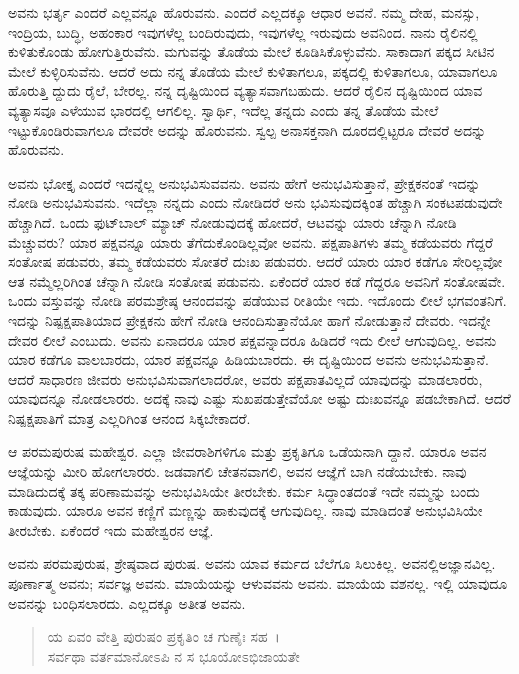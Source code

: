 ಅವನು ಭರ್ತೃ ಎಂದರೆ ಎಲ್ಲವನ್ನೂ ಹೊರುವನು. ಎಂದರೆ ಎಲ್ಲದಕ್ಕೂ ಆಧಾರ ಅವನೆ. ನಮ್ಮ ದೇಹ, ಮನಸ್ಸು, ಇಂದ್ರಿಯ, ಬುದ್ಧಿ, ಅಹಂಕಾರ ಇವುಗಳೆಲ್ಲ ಬಂದಿರುವುದು, ಇವುಗಳೆಲ್ಲ ಇರುವುದು ಅವನಿಂದ. ನಾನು ರೈಲಿನಲ್ಲಿ ಕುಳಿತುಕೊಂಡು ಹೋಗುತ್ತಿರುವೆನು. ಮಗುವನ್ನು ತೊಡೆಯ ಮೇಲೆ ಕೂಡಿಸಿಕೊಳ್ಳುವೆನು. ಸಾಕಾದಾಗ ಪಕ್ಕದ ಸೀಟಿನ ಮೇಲೆ ಕುಳ್ಳಿರಿಸುವೆನು. ಆದರೆ ಅದು ನನ್ನ ತೊಡೆಯ ಮೇಲೆ ಕುಳಿತಾಗಲೂ, ಪಕ್ಕದಲ್ಲಿ ಕುಳಿತಾಗಲೂ, ಯಾವಾಗಲೂ ಹೊರುತ್ತಿ ದ್ದುದು ರೈಲೆ, ಬೇರಲ್ಲ. ನನ್ನ ದೃಷ್ಟಿಯಿಂದ ವ್ಯತ್ಯಾಸವಾಗಬಹುದು. ಆದರೆ ರೈಲಿನ ದೃಷ್ಟಿಯಿಂದ ಯಾವ ವ್ಯತ್ಯಾಸವೂ ಎಳೆಯುವ ಭಾರದಲ್ಲಿ ಆಗಲಿಲ್ಲ. ಸ್ವಾರ್ಥಿ, ಇದೆಲ್ಲ ತನ್ನದು ಎಂದು ತನ್ನ ತೊಡೆಯ ಮೇಲೆ ಇಟ್ಟುಕೊಂಡಿರುವಾಗಲೂ ದೇವರೇ ಅದನ್ನು ಹೊರುವನು. ಸ್ವಲ್ಪ ಅನಾಸಕ್ತನಾಗಿ ದೂರದಲ್ಲಿಟ್ಟರೂ ದೇವರೆ ಅದನ್ನು ಹೊರುವನು.

ಅವನು ಭೋಕ್ತೃ ಎಂದರೆ ಇದನ್ನೆಲ್ಲ ಅನುಭವಿಸುವವನು. ಅವನು ಹೇಗೆ ಅನುಭವಿಸುತ್ತಾನೆ, ಪ್ರೇಕ್ಷಕನಂತೆ ಇದನ್ನು ನೋಡಿ ಅನುಭವಿಸುವನು. ಇದೆಲ್ಲಾ ನನ್ನದು ಎಂದು ನೋಡಿದರೆ ಅನು ಭವಿಸುವುದಕ್ಕಿಂತ ಹೆಚ್ಚಾಗಿ ಸಂಕಟಪಡುವುದೇ ಹೆಚ್ಚಾಗಿದೆ. ಒಂದು ಫುಟ್​ಬಾಲ್ ಮ್ಯಾಚ್ ನೋಡುವುದಕ್ಕೆ ಹೋದರೆ, ಆಟವನ್ನು ಯಾರು ಚೆನ್ನಾಗಿ ನೋಡಿ ಮೆಚ್ಚುವರು? ಯಾರ ಪಕ್ಷವನ್ನೂ ಯಾರು ತೆಗೆದುಕೊಂಡಿಲ್ಲವೋ ಅವನು. ಪಕ್ಷಪಾತಿಗಳು ತಮ್ಮ ಕಡೆಯವರು ಗೆದ್ದರೆ ಸಂತೋಷ ಪಡುವರು, ತಮ್ಮ ಕಡೆಯವರು ಸೋತರೆ ದುಃಖ ಪಡುವರು. ಆದರೆ ಯಾರು ಯಾರ ಕಡೆಗೂ ಸೇರಿಲ್ಲವೋ ಆತ ನಮ್ಮೆಲ್ಲರಿಗಿಂತ ಚೆನ್ನಾಗಿ ನೋಡಿ ಸಂತೋಷ ಪಡುವನು. ಏಕೆಂದರೆ ಯಾರ ಕಡೆ ಗೆದ್ದರೂ ಅವನಿಗೆ ಸಂತೋಷವೇ. ಒಂದು ವಸ್ತುವನ್ನು ನೋಡಿ ಪರಮಶ್ರೇಷ್ಠ ಆನಂದವನ್ನು ಪಡೆಯುವ ರೀತಿಯೇ ಇದು. ಇದೊಂದು ಲೀಲೆ ಭಗವಂತನಿಗೆ. ಇದನ್ನು ನಿಷ್ಪಕ್ಷಪಾತಿಯಾದ ಪ್ರೇಕ್ಷಕನು ಹೇಗೆ ನೋಡಿ ಆನಂದಿಸುತ್ತಾನೆಯೋ ಹಾಗೆ ನೋಡುತ್ತಾನೆ ದೇವರು. ಇದನ್ನೇ ದೇವರ ಲೀಲೆ ಎಂಬುದು. ಅವನು ಏನಾದರೂ ಯಾರ ಪಕ್ಷವನ್ನಾದರೂ ಹಿಡಿದರೆ ಇದು ಲೀಲೆ ಆಗುವುದಿಲ್ಲ. ಅವನು ಯಾರ ಕಡೆಗೂ ವಾಲಬಾರದು, ಯಾರ ಪಕ್ಷವನ್ನೂ ಹಿಡಿಯಬಾರದು. ಈ ದೃಷ್ಟಿಯಿಂದ ಅವನು ಅನುಭವಿಸುತ್ತಾನೆ. ಆದರೆ ಸಾಧಾರಣ ಜೀವರು ಅನುಭವಿಸುವಾಗಲಾದರೋ, ಅವರು ಪಕ್ಷಪಾತವಿಲ್ಲದೆ ಯಾವುದನ್ನು ಮಾಡಲಾರರು, ಯಾವುದನ್ನೂ ನೋಡಲಾರರು. ಅದಕ್ಕೆ ನಾವು ಎಷ್ಟು ಸುಖಪಡುತ್ತೇವೆಯೋ ಅಷ್ಟು ದುಃಖವನ್ನೂ ಪಡಬೇಕಾಗಿದೆ. ಆದರೆ ನಿಷ್ಪಕ್ಷಪಾತಿಗೆ ಮಾತ್ರ ಎಲ್ಲರಿಗಿಂತ ಆನಂದ ಸಿಕ್ಕಬೇಕಾದರೆ.

ಆ ಪರಮಪುರುಷ ಮಹೇಶ್ವರ. ಎಲ್ಲಾ ಜೀವರಾಶಿಗಳಿಗೂ ಮತ್ತು ಪ್ರಕೃತಿಗೂ ಒಡೆಯನಾಗಿ ದ್ದಾನೆ. ಯಾರೂ ಅವನ ಆಜ್ಞೆಯನ್ನು ಮೀರಿ ಹೋಗಲಾರರು. ಜಡವಾಗಲಿ ಚೇತನವಾಗಲಿ, ಅವನ ಆಜ್ಞೆಗೆ ಬಾಗಿ ನಡೆಯಬೇಕು. ನಾವು ಮಾಡಿದುದಕ್ಕೆ ತಕ್ಕ ಪರಿಣಾಮವನ್ನು ಅನುಭವಿಸಿಯೇ ತೀರಬೇಕು. ಕರ್ಮ ಸಿದ್ಧಾಂತದಂತೆ ಇದೇ ನಮ್ಮನ್ನು ಬಂದು ಕಾಡುವುದು. ಯಾರೂ ಅವನ ಕಣ್ಣಿಗೆ ಮಣ್ಣನ್ನು ಹಾಕುವುದಕ್ಕೆ ಆಗುವುದಿಲ್ಲ. ನಾವು ಮಾಡಿದಂತೆ ಅನುಭವಿಸಿಯೇ ತೀರಬೇಕು. ಏಕೆಂದರೆ ಇದು ಮಹೇಶ್ವರನ ಆಜ್ಞೆ.

ಅವನು ಪರಮಪುರುಷ, ಶ್ರೇಷ್ಠವಾದ ಪುರುಷ. ಅವನು ಯಾವ ಕರ್ಮದ ಬೆಲೆಗೂ ಸಿಲುಕಿಲ್ಲ. ಅವನಲ್ಲಿಅಜ್ಞಾನವಿಲ್ಲ. ಪೂರ್ಣಾತ್ಮ ಅವನು; ಸರ್ವಜ್ಞ ಅವನು. ಮಾಯೆಯನ್ನು ಆಳುವವನು ಅವನು. ಮಾಯೆಯ ವಶನಲ್ಲ. ಇಲ್ಲಿ ಯಾವುದೂ ಅವನನ್ನು ಬಂಧಿಸಲಾರದು. ಎಲ್ಲದಕ್ಕೂ ಅತೀತ ಅವನು.

\begin{verse}
ಯ ಏವಂ ವೇತ್ತಿ ಪುರುಷಂ ಪ್ರಕೃತಿಂ ಚ ಗುಣೈಃ ಸಹ~।\\ಸರ್ವಥಾ ವರ್ತಮಾನೋಽಪಿ ನ ಸ ಭೂಯೋಽಭಿಜಾಯತೇ
\end{verse}

